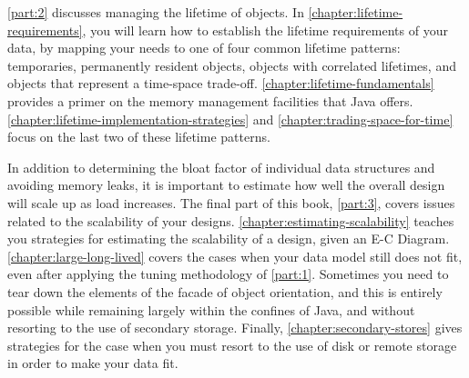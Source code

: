 
\autoref{part:2} discusses managing the lifetime of objects. In
\autoref{chapter:lifetime-requirements}, you will learn how to establish the
lifetime requirements of your data, by mapping your needs to one of four common
lifetime patterns: temporaries, permanently resident objects, objects with
correlated lifetimes, and objects that represent a time-space trade-off.
\autoref{chapter:lifetime-fundamentals} provides a primer on the memory
management facilities that Java offers.
\autoref{chapter:lifetime-implementation-strategies} and
\autoref{chapter:trading-space-for-time} focus on the last two of these lifetime
patterns.


In addition to determining the bloat factor of individual data structures and
avoiding memory leaks, it is important to estimate how well the overall design
will scale up as load increases. The final part of this book, \autoref{part:3},
covers issues related to the scalability of your designs.
\autoref{chapter:estimating-scalability} teaches you strategies for estimating
the scalability of a design, given an E-C Diagram.
\autoref{chapter:large-long-lived} covers the cases when your data model still
does not fit, even after applying the tuning methodology of \autoref{part:1}.
Sometimes you need to tear down the elements of the facade of object
orientation, and this is entirely possible while remaining largely within the
confines of Java, and without resorting to the use of secondary storage.
Finally, \autoref{chapter:secondary-stores} gives strategies for the case when
you must resort to the use of disk or remote storage in order to make your data
fit.

